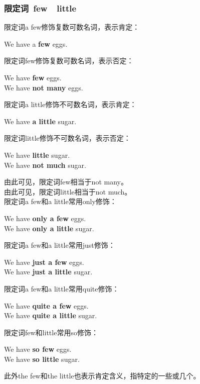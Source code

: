 \documentclass[UTF8]{ctexart}
\newcommand{\littf}[1]{{\hspace{3pt}\ttfamily #1}}
\begin{document}
\subsubsection{限定词~\littf{few}~~\littf{little}}
    限定词\littf{a few}修饰复数可数名词，表示肯定：
    \begin{center}
        \large\ttfamily
        We have a \textbf{few} eggs.\\[4mm]
    \end{center}
    限定词\littf{few}修饰复数可数名词，表示否定：
    \begin{center}
        \large\ttfamily
        We have \textbf{few} eggs.\\[2mm]
        We have \textbf{not many} eggs.\\[4mm]
    \end{center}
    限定词\littf{a little}修饰不可数名词，表示肯定：
    \begin{center}
        \large\ttfamily
        We have \textbf{a little} sugar.\\[4mm]
    \end{center}
    限定词\littf{little}修饰不可数名词，表示否定：
    \begin{center}
        \large\ttfamily
        We have \textbf{little} sugar.\\[2mm]
        We have \textbf{not much} sugar.\\[4mm]
    \end{center}
    由此可见，限定词\littf{few}相当于\littf{not many}。\\[3mm]
    由此可见，限定词\littf{little}相当于\littf{not much}。\\[8mm]
    限定词\littf{a few}和\littf{a little}常用\littf{only}修饰：
    \begin{center}
        \large\ttfamily
        We have \textbf{only a few} eggs.\\[2mm]
        We have \textbf{only a little} sugar.\\[4mm]
    \end{center}
    限定词\littf{a few}和\littf{a little}常用\littf{just}修饰：
    \begin{center}
        \large\ttfamily
        We have \textbf{just a few} eggs.\\[2mm]
        We have \textbf{just a little} sugar.\\[4mm]
    \end{center}
    限定词\littf{a few}和\littf{a little}常用\littf{quite}修饰：
    \begin{center}
        \large\ttfamily
        We have \textbf{quite a few} eggs.\\[2mm]
        We have \textbf{quite a little} sugar.\\[4mm]
    \end{center}
    限定词\littf{few}和\littf{little}常用\littf{so}修饰：
    \begin{center}
        \large\ttfamily
        We have \textbf{so few} eggs.\\[2mm]
        We have \textbf{so little} sugar.\\[4mm]
    \end{center}
    此外\littf{the few}和\littf{the little}也表示肯定含义，指特定的一些或几个。
\end{document}
